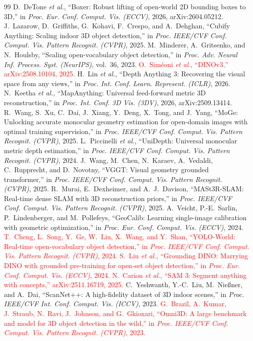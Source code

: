 \documentclass[conference]{IEEEtran}
\newcommand{\tbd}[1]{\textcolor{red}{#1}}
\begin{document}
\begin{thebibliography}{99}
 D.~DeTone \emph{et al.}, ``Boxer: Robust lifting of open-world 2D bounding boxes to 3D,'' in \emph{Proc. Eur. Conf. Comput. Vis. (ECCV)}, 2026, arXiv:2604.05212.
 J.~Lazarow, D.~Griffiths, G.~Kohavi, F.~Crespo, and A.~Dehghan, ``Cubify Anything: Scaling indoor 3D object detection,'' in \emph{Proc. IEEE/CVF Conf. Comput. Vis. Pattern Recognit. (CVPR)}, 2025.
 M.~Minderer, A.~Gritsenko, and N.~Houlsby, ``Scaling open-vocabulary object detection,'' in \emph{Proc. Adv. Neural Inf. Process. Syst. (NeurIPS)}, vol.~36, 2023.
 \tbd{O.~Sim\'eoni \emph{et al.}, ``DINOv3,'' arXiv:2508.10104, 2025.}
 H.~Lin \emph{et al.}, ``Depth Anything 3: Recovering the visual space from any views,'' in \emph{Proc. Int. Conf. Learn. Represent. (ICLR)}, 2026.
 N.~Keetha \emph{et al.}, ``MapAnything: Universal feed-forward metric 3D reconstruction,'' in \emph{Proc. Int. Conf. 3D Vis. (3DV)}, 2026, arXiv:2509.13414.
 R.~Wang, S.~Xu, C.~Dai, J.~Xiang, Y.~Deng, X.~Tong, and J.~Yang, ``MoGe: Unlocking accurate monocular geometry estimation for open-domain images with optimal training supervision,'' in \emph{Proc. IEEE/CVF Conf. Comput. Vis. Pattern Recognit. (CVPR)}, 2025.
 L.~Piccinelli \emph{et al.}, ``UniDepth: Universal monocular metric depth estimation,'' in \emph{Proc. IEEE/CVF Conf. Comput. Vis. Pattern Recognit. (CVPR)}, 2024.
 J.~Wang, M.~Chen, N.~Karaev, A.~Vedaldi, C.~Rupprecht, and D.~Novotny, ``VGGT: Visual geometry grounded transformer,'' in \emph{Proc. IEEE/CVF Conf. Comput. Vis. Pattern Recognit. (CVPR)}, 2025.
 R.~Murai, E.~Dexheimer, and A.~J.~Davison, ``MASt3R-SLAM: Real-time dense SLAM with 3D reconstruction priors,'' in \emph{Proc. IEEE/CVF Conf. Comput. Vis. Pattern Recognit. (CVPR)}, 2025.
 A.~Veicht, P.-E.~Sarlin, P.~Lindenberger, and M.~Pollefeys, ``GeoCalib: Learning single-image calibration with geometric optimization,'' in \emph{Proc. Eur. Conf. Comput. Vis. (ECCV)}, 2024.
 \tbd{T.~Cheng, L.~Song, Y.~Ge, W.~Liu, X.~Wang, and Y.~Shan, ``YOLO-World: Real-time open-vocabulary object detection,'' in \emph{Proc. IEEE/CVF Conf. Comput. Vis. Pattern Recognit. (CVPR)}, 2024.}
 \tbd{S.~Liu \emph{et al.}, ``Grounding DINO: Marrying DINO with grounded pre-training for open-set object detection,'' in \emph{Proc. Eur. Conf. Comput. Vis. (ECCV)}, 2024.}
 \tbd{N.~Carion \emph{et al.}, ``SAM 3: Segment anything with concepts,'' arXiv:2511.16719, 2025.}
 C.~Yeshwanth, Y.-C.~Liu, M.~Nie{\ss}ner, and A.~Dai, ``ScanNet++: A high-fidelity dataset of 3D indoor scenes,'' in \emph{Proc. IEEE/CVF Int. Conf. Comput. Vis. (ICCV)}, 2023.
 \tbd{G.~Brazil, A.~Kumar, J.~Straub, N.~Ravi, J.~Johnson, and G.~Gkioxari, ``Omni3D: A large benchmark and model for 3D object detection in the wild,'' in \emph{Proc. IEEE/CVF Conf. Comput. Vis. Pattern Recognit. (CVPR)}, 2023.}
\end{thebibliography}
\end{document}
